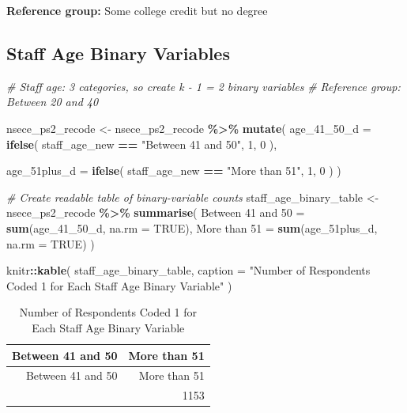 \documentclass[
]{article}
\newenvironment{Shaded}{\begin{snugshade}}{\end{snugshade}}
\newcommand{\AttributeTok}[1]{\textcolor[rgb]{0.13,0.29,0.53}{#1}}
\newcommand{\CommentTok}[1]{\textcolor[rgb]{0.56,0.35,0.01}{\textit{#1}}}
\newcommand{\ConstantTok}[1]{\textcolor[rgb]{0.56,0.35,0.01}{#1}}
\newcommand{\DecValTok}[1]{\textcolor[rgb]{0.00,0.00,0.81}{#1}}
\newcommand{\FunctionTok}[1]{\textcolor[rgb]{0.13,0.29,0.53}{\textbf{#1}}}
\newcommand{\NormalTok}[1]{#1}
\newcommand{\OtherTok}[1]{\textcolor[rgb]{0.56,0.35,0.01}{#1}}
\newcommand{\SpecialCharTok}[1]{\textcolor[rgb]{0.81,0.36,0.00}{\textbf{#1}}}
\newcommand{\StringTok}[1]{\textcolor[rgb]{0.31,0.60,0.02}{#1}}
\begin{document}
\textbf{Reference group:} Some college credit but no degree

\newpage

\subsection{Staff Age Binary
Variables}\label{staff-age-binary-variables}

\begin{Shaded}
\begin{Highlighting}[]
\CommentTok{\# Staff age: 3 categories, so create k {-} 1 = 2 binary variables}
\CommentTok{\# Reference group: Between 20 and 40}

\NormalTok{nsece\_ps2\_recode }\OtherTok{\textless{}{-}}
\NormalTok{  nsece\_ps2\_recode }\SpecialCharTok{\%\textgreater{}\%}
  \FunctionTok{mutate}\NormalTok{(}
    \AttributeTok{age\_41\_50\_d =} \FunctionTok{ifelse}\NormalTok{(}
\NormalTok{      staff\_age\_new }\SpecialCharTok{==} \StringTok{"Between 41 and 50"}\NormalTok{, }\DecValTok{1}\NormalTok{, }\DecValTok{0}
\NormalTok{    ),}
    
    \AttributeTok{age\_51plus\_d =} \FunctionTok{ifelse}\NormalTok{(}
\NormalTok{      staff\_age\_new }\SpecialCharTok{==} \StringTok{"More than 51"}\NormalTok{, }\DecValTok{1}\NormalTok{, }\DecValTok{0}
\NormalTok{    )}
\NormalTok{  )}

\CommentTok{\# Create readable table of binary{-}variable counts}
\NormalTok{staff\_age\_binary\_table }\OtherTok{\textless{}{-}}
\NormalTok{  nsece\_ps2\_recode }\SpecialCharTok{\%\textgreater{}\%}
  \FunctionTok{summarise}\NormalTok{(}
    \StringTok{\textasciigrave{}}\AttributeTok{Between 41 and 50}\StringTok{\textasciigrave{}} \OtherTok{=} \FunctionTok{sum}\NormalTok{(age\_41\_50\_d, }\AttributeTok{na.rm =} \ConstantTok{TRUE}\NormalTok{),}
    \StringTok{\textasciigrave{}}\AttributeTok{More than 51}\StringTok{\textasciigrave{}} \OtherTok{=} \FunctionTok{sum}\NormalTok{(age\_51plus\_d, }\AttributeTok{na.rm =} \ConstantTok{TRUE}\NormalTok{)}
\NormalTok{  )}

\NormalTok{knitr}\SpecialCharTok{::}\FunctionTok{kable}\NormalTok{(}
\NormalTok{  staff\_age\_binary\_table,}
  \AttributeTok{caption =} \StringTok{"Number of Respondents Coded 1 for Each Staff Age Binary Variable"}
\NormalTok{)}
\end{Highlighting}
\end{Shaded}

\begin{longtable}[]{@{}rr@{}}
\caption{Number of Respondents Coded 1 for Each Staff Age Binary
Variable}\tabularnewline
\toprule\noalign{}
Between 41 and 50 & More than 51 \\
\midrule\noalign{}
\endfirsthead
\toprule\noalign{}
Between 41 and 50 & More than 51 \\
\midrule\noalign{}
\endhead
\bottomrule\noalign{}
\endlastfoot
895 & 1153 \\
\end{longtable}
\end{document}
